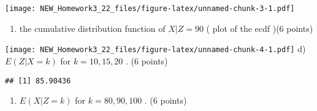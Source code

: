 \documentclass[
]{article}
\newenvironment{Shaded}{\begin{snugshade}}{\end{snugshade}}
\newcommand{\DecValTok}[1]{\textcolor[rgb]{0.00,0.00,0.81}{#1}}
\newcommand{\FunctionTok}[1]{\textcolor[rgb]{0.00,0.00,0.00}{#1}}
\newcommand{\NormalTok}[1]{#1}
\newcommand{\SpecialCharTok}[1]{\textcolor[rgb]{0.00,0.00,0.00}{#1}}
\providecommand{\tightlist}{%
  \setlength{\itemsep}{0pt}\setlength{\parskip}{0pt}}
\begin{document}
\texttt{[image: NEW\_Homework3\_22\_files/figure-latex/unnamed-chunk-3-1.pdf]}

\begin{enumerate}
\def\labelenumi{\alph{enumi})}
\setcounter{enumi}{2}
\tightlist
\item
  the cumulative distribution function of \(X|Z = 90\) ( plot of the
  ecdf )(6 points)
\end{enumerate}

\begin{Shaded}
\end{Shaded}

\texttt{[image: NEW\_Homework3\_22\_files/figure-latex/unnamed-chunk-4-1.pdf]}
d) \(E(Z|X = k)\) for \(k = 10, 15, 20\) . (6 points)

\begin{Shaded}
\end{Shaded}

\begin{verbatim}
## [1] 85.90436
\end{verbatim}

\begin{enumerate}
\def\labelenumi{\alph{enumi})}
\setcounter{enumi}{4}
\tightlist
\item
  \(E(X|Z = k)\) for \(k = 80, 90, 100\) . (6 points)
\end{enumerate}

\begin{Shaded}
\end{Shaded}
\end{document}

